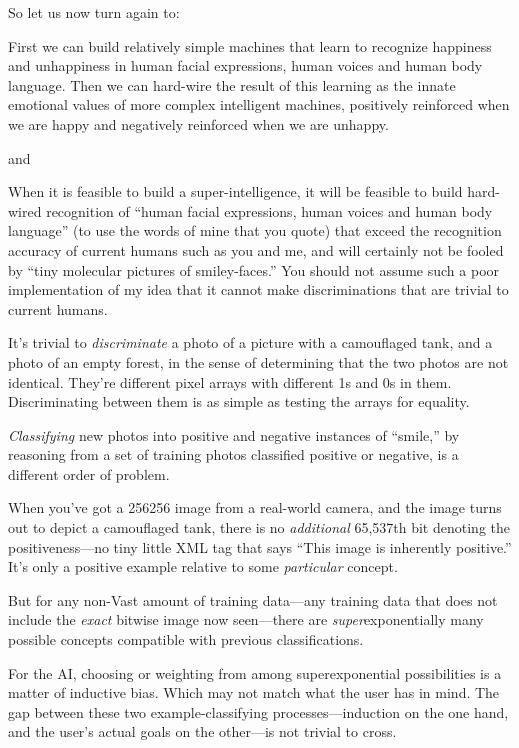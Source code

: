 {
 So let us now turn again to:}

{
 First we can build relatively simple machines that learn to
recognize happiness and unhappiness in human facial expressions, human
voices and human body language. Then we can hard-wire the result of
this learning as the innate emotional values of more complex
intelligent machines, positively reinforced when we are happy and
negatively reinforced when we are unhappy.}

{
 and}

{
 When it is feasible to build a super-intelligence, it will be
feasible to build hard-wired recognition of ``human
facial expressions, human voices and human body
language'' (to use the words of mine that you quote)
that exceed the recognition accuracy of current humans such as you and
me, and will certainly not be fooled by ``tiny
molecular pictures of smiley-faces.'' You should not
assume such a poor implementation of my idea that it cannot make
discriminations that are trivial to current humans.}

{
 It's trivial to \textit{discriminate} a photo of a
picture with a camouflaged tank, and a photo of an empty forest, in the
sense of determining that the two photos are not identical.
They're different pixel arrays with different 1s and 0s
in them. Discriminating between them is as simple as testing the arrays
for equality.}

{
 \textit{Classifying} new photos into positive and negative
instances of ``smile,'' by reasoning
from a set of training photos classified positive or negative, is a
different order of problem.}

{
 When you've got a 256{\texttimes}256 image from a
real-world camera, and the image turns out to depict a camouflaged
tank, there is no \textit{additional} 65,537th bit denoting the
positiveness---no tiny little XML tag that says ``This
image is inherently positive.'' It's
only a positive example relative to some \textit{particular} concept.}

{
 But for any non-Vast amount of training data---any training data
that does not include the \textit{exact} bitwise image now seen---there
are \textit{super}exponentially many possible concepts compatible with
previous classifications.}

{
 For the AI, choosing or weighting from among superexponential
possibilities is a matter of inductive bias. Which may not match what
the user has in mind. The gap between these two example-classifying
processes---induction on the one hand, and the user's
actual goals on the other---is not trivial to cross.}

